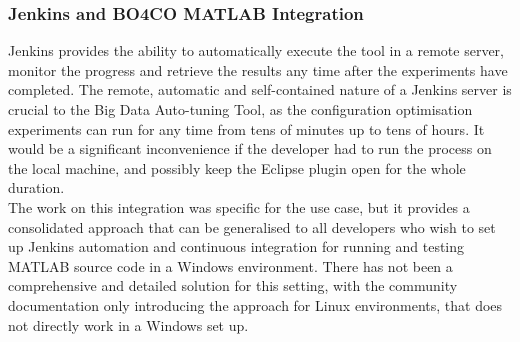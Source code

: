 \subsubsection{Jenkins and BO4CO MATLAB Integration}
Jenkins provides the ability to automatically execute the tool in a remote server, monitor the progress and retrieve the results any time after the experiments have completed. The remote, automatic and self-contained nature of a Jenkins server is crucial to the Big Data Auto-tuning Tool, as the configuration optimisation experiments can run for any time from tens of minutes up to tens of hours. It would be a significant inconvenience if the developer had to run the process on the local machine, and possibly keep the Eclipse plugin open for the whole duration.\\
The work on this integration was specific for the use case, but it provides a consolidated approach that can be generalised to all developers who wish to set up Jenkins automation and continuous integration for running and testing MATLAB source code in a Windows environment. There has not been a comprehensive and detailed solution for this setting, with the community documentation \cite{matlabjenkins} only introducing the approach for Linux environments, that does not directly work in a Windows set up.\\
